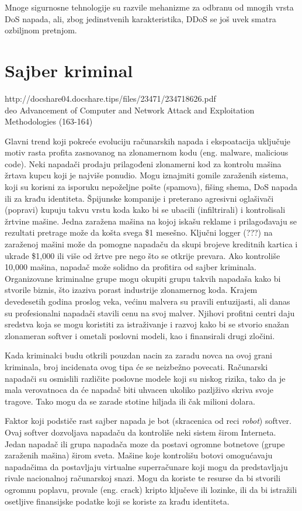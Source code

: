 \documentclass[a4paper]{article}
\theoremstyle{break}
\begin{document}
{Mnoge sigurnosne tehnologije su razvile mehanizme za odbranu od mnogih vrsta DoS napada, ali, zbog jedinstvenih karakteristika, DDoS se još uvek smatra ozbiljnom pretnjom.

\section{Sajber kriminal}
\label{sec:sajber_kriminal}

http://docshare04.docshare.tips/files/23471/234718626.pdf \\
deo Advancement of  Computer and Network Attack and Exploitation Methodologies (163-164)


Glavni trend koji pokreće evoluciju računarskih napada i ekspoatacija uključuje motiv rasta profita zasnovanog na zlonamernom kodu (eng. malware, malicious code). Neki napadači prodaju prilagođeni zlonamerni kod za kontrolu mašina žrtava kupcu koji je najviše ponudio. Mogu iznajmiti gomile zaraženih sistema, koji su korisni za isporuku nepoželjne pošte (spamova), fišing shema, DoS napada ili za krađu identiteta. Špijunske kompanije i preterano agresivni oglašivači (popravi) kupuju takvu vrstu koda kako bi se ubacili (infiltrirali) i kontrolisali žrtvine mašine. Jedna zaražena mašina na kojoj iskašu reklame i prilagođavaju se rezultati pretrage može da košta svega \$1 mesešno. Ključni logger (???) na zaraženoj mašini može da pomogne napadaču da skupi brojeve kreditnih kartica i ukrade \$1,000 ili više od žrtve pre nego što se otkrije prevara. Ako kontroliše 10,000 mašina, napadač može solidno da profitira od sajber kriminala. Organizovane kriminalne grupe mogu okupiti grupu takvih napadaša kako bi stvorile biznis, što izaziva porast industrije zlonamernog koda. Krajem devedesetih godina proslog veka, većinu malvera su pravili entuzijasti, ali danas su profesionalni napadači stavili cenu na svoj malver. Njihovi profitni centri daju sredstva koja se mogu koristiti za istraživanje i razvoj kako bi se stvorio snažan zlonameran softver i ometali poslovni modeli, kao i finansirali drugi zločini. 

Kada kriminalci budu otkrili pouzdan nacin za zaradu novca na ovoj grani kriminala, broj incidenata ovog tipa će se neizbežno povecati. Računarski napadači su osmislili različite poslovne modele koji su niskog rizika, tako da je mala verovatnoca da će napadač biti uhvacen ukoliko pazljživo skriva svoje tragove. Tako mogu da se zarade stotine hiljada ili čak milioni dolara.

Faktor koji podstiče rast sajber napada je bot (skracenica od reci \textit{robot}) softver. Ovaj softver dozvoljava napadaču da kontroliše neki sistem širom Interneta. Jedan napadač ili grupa napadača moze da postavi ogromne botnetove (grupe zaraženih mašina) širom sveta. Mašine koje kontrolišu botovi omogućavaju napadačima da postavljaju virtualne superračunare koji mogu da predstavljaju rivale nacionalnoj računarskoj snazi. Mogu da koriste te resurse da bi stvorili ogromnu poplavu, provale (eng. crack) kripto ključeve ili lozinke, ili da bi istražili osetljive finansijske podatke koji se koriste za krađu identiteta.

}
\end{document}
